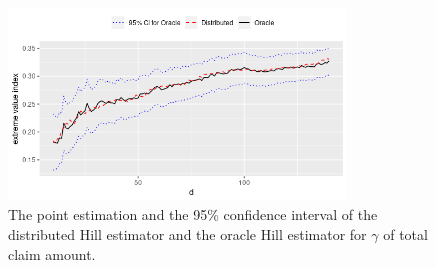 \documentclass{beamer}
\begin{document}
\begin{frame}
    \frametitle{}
    \begin{figure}[htbp]
        \centering
          \includegraphics[width=0.8\textwidth]{DCvsOracle.png}
        \caption{The point estimation and the 95\% confidence interval of the distributed Hill estimator and the oracle Hill estimator for $\gamma$ of total claim amount. }
        \label{figure Insurance_example_gamma_DC}
      \end{figure}
    

\end{frame}
\end{document}
